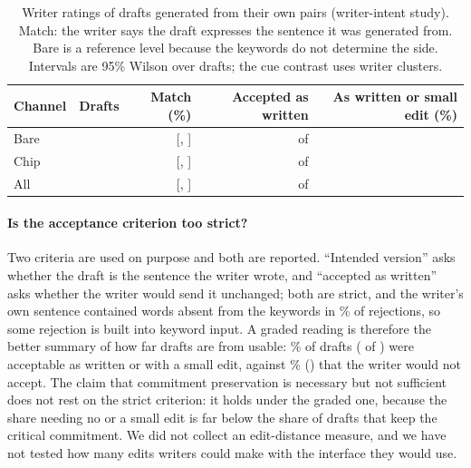 \begin{table}[t]
\centering\small
\caption{Writer ratings of drafts generated from their own pairs (writer-intent study). Match: the writer says the draft expresses the sentence it was generated from. Bare is a reference level because the keywords do not determine the side. Intervals are 95\% Wilson over drafts; the cue contrast uses writer clusters.}\label{tab:s4-p18}
\begin{tabular}{@{}lrrrr@{}}
\toprule
Channel & Drafts & Match (\%) & Accepted as written & As written or small edit (\%) \\
\midrule
Bare & \jmpOneEightYesBareN{} & \jmpOneEightMatchBare{} [\jmpOneEightMatchBareLo{}, \jmpOneEightMatchBareHi{}] & \jmpOneEightYesBareK{} of \jmpOneEightYesBareN{} & \jmpOneEightSmallBare{} \\
Chip & \jmpOneEightYesChipN{} & \jmpOneEightMatchChip{} [\jmpOneEightMatchChipLo{}, \jmpOneEightMatchChipHi{}] & \jmpOneEightYesChipK{} of \jmpOneEightYesChipN{} & \jmpOneEightSmallChip{} \\
All & \jmpOneEightAcceptN{} & \jmpOneEightMatchAll{} [\jmpOneEightMatchAllLo{}, \jmpOneEightMatchAllHi{}] & \jmpOneEightAcceptYesK{} of \jmpOneEightAcceptN{} & \jmpOneEightAcceptYesSmall{} \\
\bottomrule
\end{tabular}
\end{table}

\paragraph{Is the acceptance criterion too strict?}
Two criteria are used on purpose and both are reported. ``Intended version'' asks whether the draft is the sentence the writer wrote, and ``accepted as written'' asks whether the writer would send it unchanged; both are strict, and the writer's own sentence contained words absent from the keywords in \jmwmDroppedUnrecShare{}\% of rejections, so some rejection is built into keyword input. A graded reading is therefore the better summary of how far drafts are from usable: \jmpOneEightAcceptYesSmall{}\% of drafts (\jmpOneEightAcceptYesSmallK{} of \jmpOneEightAcceptN{}) were acceptable as written or with a small edit, against \jmpOneEightAcceptNo{}\% (\jmpOneEightAcceptNoK{}) that the writer would not accept. The claim that commitment preservation is necessary but not sufficient does not rest on the strict criterion: it holds under the graded one, because the share needing no or a small edit is far below the share of drafts that keep the critical commitment. We did not collect an edit-distance measure, and we have not tested how many edits writers could make with the interface they would use.

